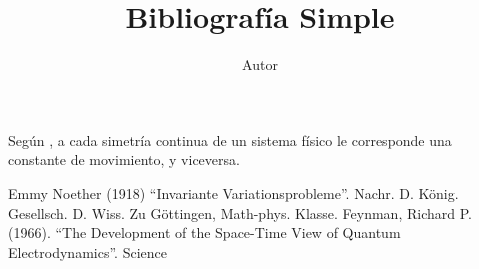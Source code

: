 \documentclass[12pt,a4paper]{article}
\author{Autor}
\title{Bibliografía Simple}
\begin{document}
\maketitle

Según \cite{Noether1918}, a cada simetría continua de un sistema físico le corresponde una constante de movimiento, y viceversa.

\renewcommand{\refname}{Bibliografía} %
\begin{thebibliography}{2}
 Emmy Noether (1918) ``Invariante Variationsprobleme''. Nachr. D. König. Gesellsch. D. Wiss. Zu Göttingen, Math-phys. Klasse.
 Feynman, Richard P. (1966). ``The Development of the Space-Time View of Quantum Electrodynamics''. Science
\end{thebibliography}
\end{document}
